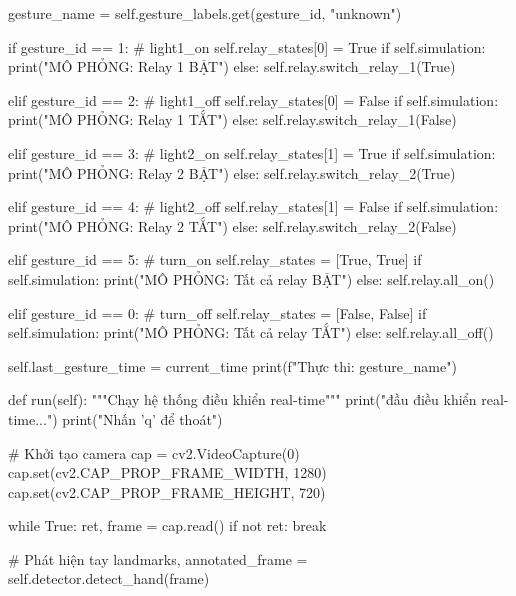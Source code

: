 \begin{aivncodebox}
\begin{python}
        gesture_name = self.gesture_labels.get(gesture_id, "unknown")
        
        if gesture_id == 1:  # light1_on
            self.relay_states[0] = True
            if self.simulation:
                print("MÔ PHỎNG: Relay 1 BẬT")
            else:
                self.relay.switch_relay_1(True)
        
        elif gesture_id == 2:  # light1_off
            self.relay_states[0] = False
            if self.simulation:
                print("MÔ PHỎNG: Relay 1 TẮT")
            else:
                self.relay.switch_relay_1(False)
        
        elif gesture_id == 3:  # light2_on
            self.relay_states[1] = True
            if self.simulation:
                print("MÔ PHỎNG: Relay 2 BẬT")
            else:
                self.relay.switch_relay_2(True)
        
        elif gesture_id == 4:  # light2_off
            self.relay_states[1] = False
            if self.simulation:
                print("MÔ PHỎNG: Relay 2 TẮT")
            else:
                self.relay.switch_relay_2(False)
        
        elif gesture_id == 5:  # turn_on
            self.relay_states = [True, True]
            if self.simulation:
                print("MÔ PHỎNG: Tất cả relay BẬT")
            else:
                self.relay.all_on()
        
        elif gesture_id == 0:  # turn_off
            self.relay_states = [False, False]
            if self.simulation:
                print("MÔ PHỎNG: Tất cả relay TẮT")
            else:
                self.relay.all_off()
        
        self.last_gesture_time = current_time
        print(f"Thực thi: {gesture_name}")
    
    def run(self):
        """Chạy hệ thống điều khiển real-time"""
        print(" đầu điều khiển real-time...")
        print("Nhấn 'q' để thoát")
        
        # Khởi tạo camera
        cap = cv2.VideoCapture(0)
        cap.set(cv2.CAP_PROP_FRAME_WIDTH, 1280)
        cap.set(cv2.CAP_PROP_FRAME_HEIGHT, 720)
        
        while True:
            ret, frame = cap.read()
            if not ret:
                break
            
            # Phát hiện tay
            landmarks, annotated_frame = self.detector.detect_hand(frame)
            

\end{python}
\end{aivncodebox}
